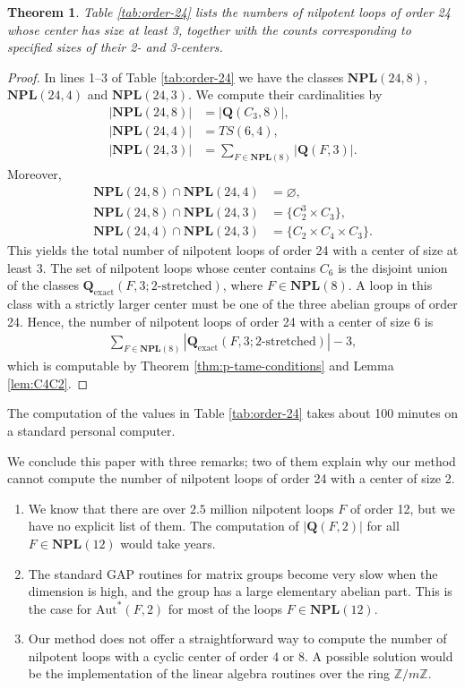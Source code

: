 \documentclass[12pt,a4paper]{amsart}
\newtheorem{theorem}{Theorem}[section]
\theoremstyle{definition}
\newcommand{\boldQ}{\mathbf{Q}}
\newcommand{\boldQexact}{\mathbf{Q}_{\mathrm{exact}}}
\newcommand{\NPL}{\mathbf{NPL}}
\begin{document}
\begin{theorem} \label{thm:large-center-24}
Table \ref{tab:order-24} lists the numbers of nilpotent loops of order 24 whose center has size at least 3, together with the counts corresponding to specified sizes of their 2- and 3-centers.
\end{theorem}
\begin{proof}
In lines 1--3 of Table \ref{tab:order-24} we have the classes $\NPL(24,8)$, $\NPL(24,4)$ and $\NPL(24,3)$. We compute their cardinalities by
\begin{align*}
|\NPL(24,8)| &= |\boldQ(C_3,8)|, \\
|\NPL(24,4)| &= TS(6,4), \\
|\NPL(24,3)| &= \sum_{F\in \NPL(8)} |\boldQ(F,3)|.
\end{align*}
Moreover,
\begin{align*}
\NPL(24,8) \cap \NPL(24,4) &= \varnothing, \\
\NPL(24,8) \cap \NPL(24,3) &= \{C_2^3 \times C_3\}, \\
\NPL(24,4) \cap \NPL(24,3) &= \{C_2\times C_4 \times C_3\}.
\end{align*}
This yields the total number of nilpotent loops of order 24 with a center of size at least 3. 
The set of nilpotent loops whose center contains $C_6$ is the disjoint union of the classes $\boldQexact(F,3;\text{$2$-stretched})$, where $F\in \NPL(8)$. A loop in this class with a strictly larger center must be one of the three abelian groups of order 24. Hence, the number of nilpotent loops of order 24 with a center of size 6 is
\begin{align*}
\sum_{F\in \NPL(8)} |\boldQexact(F,3;\text{$2$-stretched})|-3,
\end{align*}
which is computable by Theorem \ref{thm:p-tame-conditions} and Lemma \ref{lem:C4C2}. 
\end{proof}

The computation of the values in Table \ref{tab:order-24} takes about 100 minutes on a standard personal computer. 

We conclude this paper with three remarks; two of them explain why our method cannot compute the number of nilpotent loops of order 24 with a center of size 2.
\begin{enumerate}
\item We know that there are over $2.5$ million nilpotent loops $F$ of order 12, but we have no explicit list of them. The computation of $|\boldQ(F,2)|$ for all $F\in \NPL(12)$ would take years.
\item The standard GAP routines for matrix groups become very slow when the dimension is high, and the group has a large elementary abelian part. This is the case for $\mathrm{Aut}^{\!*}(F,2)$ for most of the loops $F\in \NPL(12)$. 
\item Our method does not offer a straightforward way to compute the number of nilpotent loops with a cyclic center of order 4 or 8. A possible solution would be the implementation of the linear algebra routines over the ring $\mathbb{Z}/m\mathbb{Z}$. 
\end{enumerate}
\end{document}
